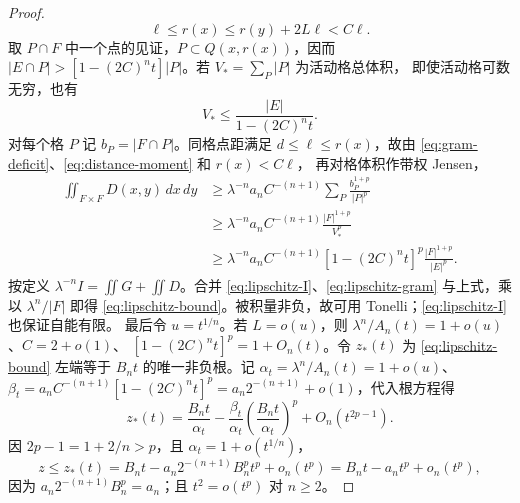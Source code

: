 \begin{proof}
\[
\ell\le r(x)\le r(y)+2L\ell<C\ell.
\]
取 $P\cap F$ 中一个点的见证，$P\subset Q(x,r(x))$，因而 $|E\cap P|>[1-(2C)^nt]|P|$。若 $V_* =\sum_P|P|$ 为活动格总体积， 即使活动格可数无穷，也有
\begin{equation}\label{eq:lipschitz-active-grid}
V_*\le\frac{|E|}{1-(2C)^nt}.
\end{equation}
对每个格 $P$ 记 $b_P=|F\cap P|$。同格点距满足 $d\le\ell\le r(x)$，故由 \eqref{eq:gram-deficit}、\eqref{eq:distance-moment} 和 $r(x)<C\ell$， 再对格体积作带权 Jensen，
\[
 \begin{aligned}
 \iint_{F\times F}D(x,y)\,dx\,dy
 &\ge\lambda^{-n}a_nC^{-(n+1)}
       \sum_P\frac{b_P^{1+p}}{|P|^p}\\
 &\ge\lambda^{-n}a_nC^{-(n+1)}
       \frac{|F|^{1+p}}{V_*^p}\\
 &\ge\lambda^{-n}a_nC^{-(n+1)}
       [1-(2C)^nt]^p\frac{|F|^{1+p}}{|E|^p}.
 \end{aligned}
\]
按定义 $\lambda^{-n}I=\iint G+\iint D$。合并 \eqref{eq:lipschitz-I}、\eqref{eq:lipschitz-gram} 与上式，乘以 $\lambda^n/|F|$ 即得 \eqref{eq:lipschitz-bound}。被积量非负，故可用 Tonelli；\eqref{eq:lipschitz-I} 也保证自能有限。 最后令 $u=t^{1/n}$。若 $L=o(u)$，则 $\lambda^n/A_n(t)=1+o(u)$、$C=2+o(1)$、 $[1-(2C)^nt]^p=1+O_n(t)$。令 $z_*(t)$ 为 \eqref{eq:lipschitz-bound} 左端等于 $B_n t$ 的唯一非负根。记 $\alpha_t=\lambda^n/A_n(t)=1+o(u)$、 $\beta_t=a_nC^{-(n+1)}[1-(2C)^nt]^p=a_n2^{-(n+1)}+o(1)$，代入根方程得
\[
z_*(t)=\frac{B_n t}{\alpha_t}-\frac{\beta_t}{\alpha_t} \left(\frac{B_n t}{\alpha_t}\right)^p+O_n(t^{2p-1}).
\]
因 $2p-1=1+2/n>p$，且 $\alpha_t=1+o(t^{1/n})$，
\[
z\le z_*(t)=B_n t-a_n2^{-(n+1)}B_n^pt^p+o_n(t^p) =B_n t-a_nt^p+o_n(t^p),
\]
因为 $a_n2^{-(n+1)}B_n^p=a_n$；且 $t^2=o(t^p)$ 对 $n\ge2$。
\end{proof}
